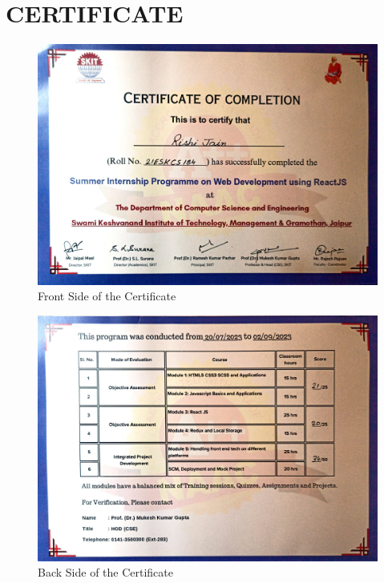 \chapter{CERTIFICATE}

\begin{figure}[h]
    \centering
    \includegraphics[scale=0.13]{project/images/front.jpg}
    \caption{Front Side of the Certificate}
\end{figure}

\begin{figure}[h]
    \centering
    \includegraphics[scale=0.13]{project/images/PICHE.jpg}
    \caption{Back Side of the Certificate}
\end{figure}
